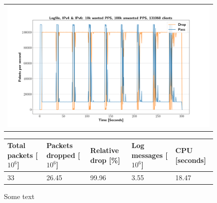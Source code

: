 \begin{figure}[p]
	\label{fig:simplefail2ban:disk:ip46:100k}
	\centering
	\scriptsize
	\begin{tabular}{c}
    	\centerline{\includegraphics[width=1.2\textwidth]{images/simplefail2ban_disk_ipv46_v10k_iv100k_c131068.png}}
	\end{tabular}
	\begin{tabular}{lllll}
		\toprule
		\textbf{Total packets [$10^6$]} & \textbf{Packets dropped [$10^6$]} & \textbf{Relative drop [\%]} & \textbf{Log messages [$10^6$]} & \textbf{CPU [seconds]} \\ \midrule 
		33 & 26.45 & 99.96 & 3.55 & 18.47 \\
	\bottomrule
	\end{tabular}
	\caption[Simplefail2ban, Logfile IPv4 \& IPv6, 100k \ac{PPS}]{Some text}
\end{figure}


